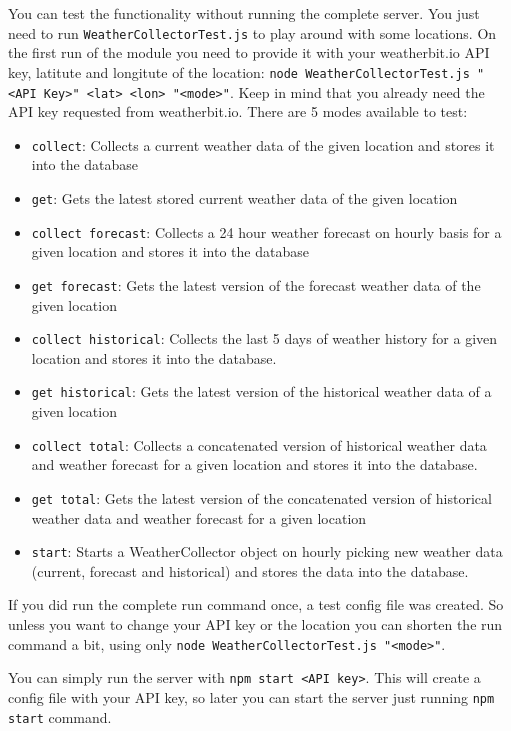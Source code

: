 You can test the functionality without running the complete server.
You just need to run \texttt{WeatherCollectorTest.js} to play around with some locations. 
On the first run of the module you need to provide it with your weatherbit.io API key, latitute and longitute of the location: \texttt{node WeatherCollectorTest.js "<API Key>" <lat> <lon> "<mode>"}. 
Keep in mind that you already need the API key requested from weatherbit.io.
There are 5 modes available to test:
\begin{itemize}
	\item \texttt{collect}: Collects a current weather data of the given location and stores it into the database
	\item \texttt{get}: Gets the latest stored current weather data of the given location
	\item \texttt{collect forecast}: Collects a 24 hour weather forecast on hourly basis for a given location and stores it into the database
	\item \texttt{get forecast}: Gets the latest version of the forecast weather data of the given location
	\item \texttt{collect historical}: Collects the last 5 days of weather history for a given location and stores it into the database.
    \item \texttt{get historical}: Gets the latest version of the historical weather data of a given location
    \item \texttt{collect total}: Collects a concatenated version of historical weather data and weather forecast for a given location and stores it into the database.
    \item \texttt{get total}: Gets the latest version of the concatenated version of historical weather data and weather forecast for a given location
	\item \texttt{start}: Starts a WeatherCollector object on hourly picking new weather data (current, forecast and historical) and stores the data into the database.
\end{itemize}

If you did run the complete run command once, a test config file was created. 
So unless you want to change your API key or the location you can shorten the run command a bit, using only \texttt{node WeatherCollectorTest.js "<mode>"}.

You can simply run the server with \texttt{npm start <API key>}. 
This will create a config file with your API key, so later you can start the server just running \texttt{npm start} command.

